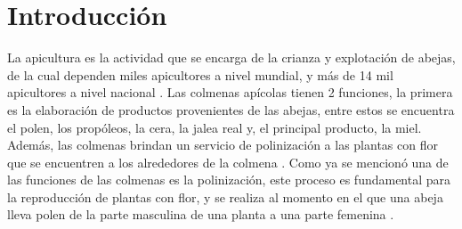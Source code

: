 \chapter*{Introducción}

La apicultura es la actividad que se encarga de la crianza y explotación de abejas, de la cual dependen miles apicultores a nivel mundial, y más de 14 mil apicultores a nivel nacional \cite{data_mexico_2023a}.
Las colmenas apícolas tienen 2 funciones, la primera es la elaboración de productos provenientes de las abejas, entre estos se encuentra el polen, los propóleos, la cera, la jalea real y, el principal producto, la miel. Además, las colmenas brindan un servicio de polinización a las plantas con flor que se encuentren a los alrededores de la colmena \cite{bradbear_2005}.
Como ya se mencionó una de las funciones de las colmenas es la polinización, este proceso es fundamental para la reproducción de plantas con flor, y se realiza al momento en el que una abeja lleva polen de la parte masculina de una planta a una parte femenina \cite{bradbear_2005}.
